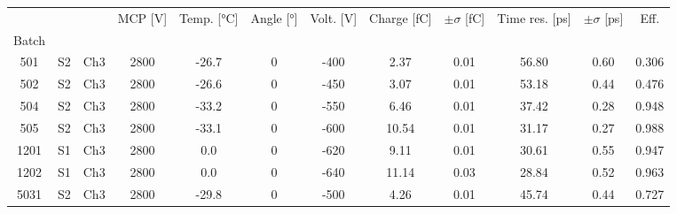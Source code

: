 \begin{tabular}{cccccccccccc}
\toprule
 &  &  & MCP [V] & Temp. [°C] & Angle [°] & Volt. [V] & Charge [fC] & \(\pm\sigma\) [fC] & Time res. [ps] & \(\pm\sigma\) [ps] & Eff. \\
Batch &  &  &  &  &  &  &  &  &  &  &  \\
\midrule
501 & S2 & Ch3 & 2800 & -26.7 & 0 & -400 & 2.37 & 0.01 & 56.80 & 0.60 & 0.306 \\
502 & S2 & Ch3 & 2800 & -26.6 & 0 & -450 & 3.07 & 0.01 & 53.18 & 0.44 & 0.476 \\
504 & S2 & Ch3 & 2800 & -33.2 & 0 & -550 & 6.46 & 0.01 & 37.42 & 0.28 & 0.948 \\
505 & S2 & Ch3 & 2800 & -33.1 & 0 & -600 & 10.54 & 0.01 & 31.17 & 0.27 & 0.988 \\
1201 & S1 & Ch3 & 2800 & 0.0 & 0 & -620 & 9.11 & 0.01 & 30.61 & 0.55 & 0.947 \\
1202 & S1 & Ch3 & 2800 & 0.0 & 0 & -640 & 11.14 & 0.03 & 28.84 & 0.52 & 0.963 \\
5031 & S2 & Ch3 & 2800 & -29.8 & 0 & -500 & 4.26 & 0.01 & 45.74 & 0.44 & 0.727 \\
\bottomrule
\end{tabular}
